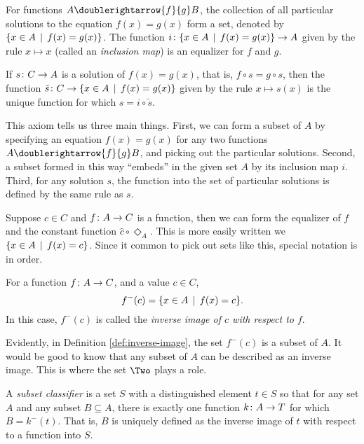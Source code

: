 \begin{principle}
	For functions $A\doublerightarrow{f}{g} B$, the collection of all particular solutions to the equation $f(x)=g(x)$ form a set, denoted by $\{x\in A\,\mid\, f(x) = g(x)\}$. 	
	The function ${i}\colon{\{x\in A\,\mid\,f(x)=g(x)\}}\to{A}$ given by the rule $x\mapsto x$ (called an \emph{inclusion map}) is an equalizer for $f$ and $g$.
	
	If ${s}\colon{C}\to{A}$ is a solution of  $f(x)=g(x)$, that is, $f\circ s = g\circ s$,
	then the function ${\check s}\colon{C}\to{\{x\in A\,\mid\,f(x)=g(x)\}}$ given by the rule $x\mapsto s(x)$
	is the unique function for which $s = i\circ \check s$. 
\end{principle}

This axiom tells us three main things.
First, we can form a subset of $A$ by specifying an equation $f(x)=g(x)$ for any two functions $A\doublerightarrow{f}{g}B$, and picking out the particular solutions.
Second, a subset formed in this way ``embeds'' in the given set $A$ by its inclusion map $i$.
Third, for any solution $s$, the function into the set of particular solutions is defined by the same rule as $s$.

Suppose $c\in C$ and ${f}\colon{A}\to{C}$ is a function, then we can form the equalizer of $f$ and the constant function $\hat{c}\circ\Diamond_A$.
This is more easily written we $\{x\in A\,\mid\, f(x)=c\}$.
Since it common to pick out sets like this, special notation is in order.

\begin{defn}\label{def:inverse-image}
	For a function ${f}\colon{A}\to{C}$, and a value $c\in C$, 
	\[f^-(c) = \{x\in A\,\mid\, f(x)=c\}.\] 
	In this case, $f^-(c)$ is called the \emph{inverse image of $c$ with respect to $f$}.
\end{defn}

Evidently, in Definition \ref{def:inverse-image}, the set $f^-(c)$ is a subset of $A$.
It would be good to know that any subset of $A$ can be described as an inverse image.
This is where the set $\Two$ plays a role.

\begin{defn}\label{def:subset-classifier}
	A \emph{subset classifier} is a set $S$ with a distinguished element $t\in S$ so that for any set $A$ and any subset $B\subseteq A$, there is exactly one function ${k}\colon{A}\to{T}$ for which $B = k^-(t)$.
	That is, $B$ is uniquely defined as the inverse image of $t$ with respect to a function into $S$.
\end{defn}

